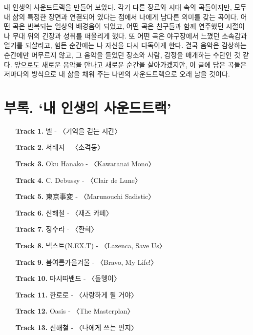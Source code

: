\documentclass{article}
\begin{document}
\indent 내 인생의 사운드트랙을 만들어 보았다. 각기 다른 장르와 시대 속의 곡들이지만, 모두 내 삶의 특정한 장면과 연결되어 있다는 점에서 나에게 남다른 의미를 갖는 곡이다. 어떤 곡은 반복되는 일상의 배경음이 되었고, 어떤 곡은 친구들과 함께 연주했던 시절이나 무대 위의 긴장과 성취를 떠올리게 했다. 또 어떤 곡은 야구장에서 느꼈던 소속감과 열기를 되살리고, 힘든 순간에는 나 자신을 다시 다독이게 한다. 결국 음악은 감상하는 순간에만 머무르지 않고, 그 음악을 들었던 장소와 사람, 감정을 매개하는 수단인 것 같다. 앞으로도 새로운 음악을 만나고 새로운 순간을 살아가겠지만, 이 글에 담은 곡들은 저마다의 방식으로 내 삶을 채워 주는 나만의 사운드트랙으로 오래 남을 것이다.

\newpage
\section{부록. `내 인생의 사운드트랙'}
\bigskip
\begin{itemize}
  \item[\textbf{Track 1.}] 넬 - 〈기억을 걷는 시간〉
  \item[\textbf{Track 2.}] 서태지 - 〈소격동〉
  \item[\textbf{Track 3.}] Oku Hanako - 〈Kawaranai Mono〉
  \vspace{0.5em}
  \item[\textbf{Track 4.}] C. Debussy - 〈Clair de Lune〉
  \item[\textbf{Track 5.}] 東京事変 - 〈Marunouchi Sadistic〉 
  \item[\textbf{Track 6.}] 신해철 - 〈재즈 카페〉
  \vspace{0.5em}
  \item[\textbf{Track 7.}] 정수라 - 〈환희〉
  \item[\textbf{Track 8.}] 넥스트(N.EX.T) - 〈Lazenca, Save Us〉
  \item[\textbf{Track 9.}] 봄여름가을겨울 - 〈Bravo, My Life!〉   
  \item[\textbf{Track 10.}] 마시따밴드 - 〈돌멩이〉
  \vspace{0.5em}
  \item[\textbf{Track 11.}] 한로로 - 〈사랑하게 될 거야〉
  \item[\textbf{Track 12.}] Oasis - 〈The Masterplan〉
  \item[\textbf{Track 13.}] 신해철 - 〈나에게 쓰는 편지〉
\end{itemize}
\end{document}
